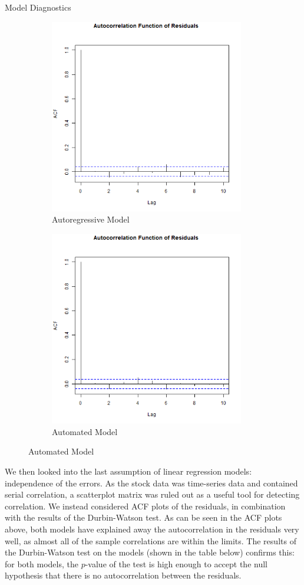 \documentclass[]{article}
\begin{document}
\begin{section}{Model Diagnostics}
\begin{figure}[H]
\begin{subfigure}{.5\textwidth}
  \includegraphics[width=85mm]{diagnostics/arm_acf_residuals.png}
  \caption{Autoregressive Model}
\end{subfigure}%
\begin{subfigure}{.5\textwidth}
  \includegraphics[width=85mm]{diagnostics/fm_acf_residuals.png}
  \caption{Automated Model}
\end{subfigure}
\end{figure}

We then looked into the last assumption of linear regression models: independence of the errors. As the stock data was time-series data and contained serial correlation, a scatterplot matrix was ruled out as a useful tool for detecting correlation. We instead considered ACF plots of the residuals, in combination with the results of the Durbin-Watson test. As can be seen in the ACF plots above, both models have explained away the autocorrelation in the residuals very well, as almost all of the sample correlations are within the limits. The results of the Durbin-Watson test on the models (shown in the table below) confirms this: for both models, the $p$-value of the test is high enough to accept the null hypothesis that there is no autocorrelation between the residuals.





\end{section}
\end{document}
